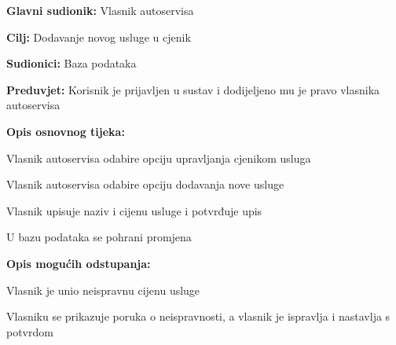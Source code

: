 \noindent {}
\begin{packed_item}
	
	\item \textbf{Glavni sudionik: } Vlasnik autoservisa
	\item  \textbf{Cilj:} Dodavanje novog usluge u cjenik
	\item  \textbf{Sudionici:} Baza podataka
	\item  \textbf{Preduvjet:} Korisnik je prijavljen u sustav i dodijeljeno
	mu je pravo vlasnika autoservisa
	\item  \textbf{Opis osnovnog tijeka:}
	
	\item[] \begin{packed_enum}
		
		\item Vlasnik autoservisa odabire opciju upravljanja cjenikom usluga
		\item Vlasnik autoservisa odabire opciju dodavanja nove usluge
		\item Vlasnik upisuje naziv i cijenu usluge i potvrđuje upis
		\item U bazu podataka se pohrani promjena
		
	\end{packed_enum}
	
	\item  \textbf{Opis mogućih odstupanja:}
	\item[] \begin{packed_item}
		\item[3.a] Vlasnik je unio neispravnu cijenu usluge
		\item[] \begin{packed_enum}
			\item Vlasniku se prikazuje poruka o neispravnosti, a vlasnik je
			ispravlja i nastavlja s potvrdom
		\end{packed_enum}
	\end{packed_item}
	
\end{packed_item}

